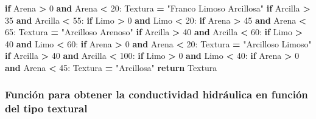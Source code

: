 \documentclass[
]{article}
\newenvironment{Shaded}{\begin{snugshade}}{\end{snugshade}}
\newcommand{\ControlFlowTok}[1]{\textcolor[rgb]{0.13,0.29,0.53}{\textbf{#1}}}
\newcommand{\DecValTok}[1]{\textcolor[rgb]{0.00,0.00,0.81}{#1}}
\newcommand{\KeywordTok}[1]{\textcolor[rgb]{0.13,0.29,0.53}{\textbf{#1}}}
\newcommand{\NormalTok}[1]{#1}
\newcommand{\OperatorTok}[1]{\textcolor[rgb]{0.81,0.36,0.00}{\textbf{#1}}}
\newcommand{\StringTok}[1]{\textcolor[rgb]{0.31,0.60,0.02}{#1}}
\begin{document}
\begin{Shaded}
\begin{Highlighting}[]
      \ControlFlowTok{if}\NormalTok{ Arena }\OperatorTok{\textgreater{}} \DecValTok{0} \KeywordTok{and}\NormalTok{ Arena }\OperatorTok{\textless{}} \DecValTok{20}\NormalTok{:}
\NormalTok{        Textura }\OperatorTok{=} \StringTok{"Franco Limoso Arcillosa"}
  \ControlFlowTok{if}\NormalTok{ Arcilla }\OperatorTok{\textgreater{}} \DecValTok{35} \KeywordTok{and}\NormalTok{ Arcilla }\OperatorTok{\textless{}} \DecValTok{55}\NormalTok{:}
    \ControlFlowTok{if}\NormalTok{ Limo }\OperatorTok{\textgreater{}} \DecValTok{0} \KeywordTok{and}\NormalTok{ Limo }\OperatorTok{\textless{}} \DecValTok{20}\NormalTok{:}
      \ControlFlowTok{if}\NormalTok{ Arena }\OperatorTok{\textgreater{}} \DecValTok{45} \KeywordTok{and}\NormalTok{ Arena }\OperatorTok{\textless{}} \DecValTok{65}\NormalTok{:}
\NormalTok{        Textura }\OperatorTok{=} \StringTok{"Arcilloso Arenoso"}
  \ControlFlowTok{if}\NormalTok{ Arcilla }\OperatorTok{\textgreater{}} \DecValTok{40} \KeywordTok{and}\NormalTok{ Arcilla }\OperatorTok{\textless{}} \DecValTok{60}\NormalTok{:}
    \ControlFlowTok{if}\NormalTok{ Limo }\OperatorTok{\textgreater{}} \DecValTok{40} \KeywordTok{and}\NormalTok{ Limo }\OperatorTok{\textless{}} \DecValTok{60}\NormalTok{:}
      \ControlFlowTok{if}\NormalTok{ Arena }\OperatorTok{\textgreater{}} \DecValTok{0} \KeywordTok{and}\NormalTok{ Arena }\OperatorTok{\textless{}} \DecValTok{20}\NormalTok{:}
\NormalTok{        Textura }\OperatorTok{=} \StringTok{"Arcilloso Limoso"}
  \ControlFlowTok{if}\NormalTok{ Arcilla }\OperatorTok{\textgreater{}} \DecValTok{40} \KeywordTok{and}\NormalTok{ Arcilla }\OperatorTok{\textless{}} \DecValTok{100}\NormalTok{:}
    \ControlFlowTok{if}\NormalTok{ Limo }\OperatorTok{\textgreater{}} \DecValTok{0} \KeywordTok{and}\NormalTok{ Limo }\OperatorTok{\textless{}} \DecValTok{40}\NormalTok{:}
      \ControlFlowTok{if}\NormalTok{ Arena }\OperatorTok{\textgreater{}} \DecValTok{0} \KeywordTok{and}\NormalTok{ Arena }\OperatorTok{\textless{}} \DecValTok{45}\NormalTok{:}
\NormalTok{        Textura }\OperatorTok{=} \StringTok{"Arcillosa"}
  \ControlFlowTok{return}\NormalTok{ Textura}
\end{Highlighting}
\end{Shaded}

\hypertarget{funciuxf3n-para-obtener-la-conductividad-hidruxe1ulica-en-funciuxf3n-del-tipo-textural}{%
\subsubsection{Función para obtener la conductividad hidráulica en
función del tipo
textural}\label{funciuxf3n-para-obtener-la-conductividad-hidruxe1ulica-en-funciuxf3n-del-tipo-textural}}
\end{document}
